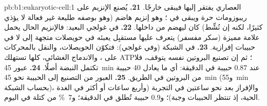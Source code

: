 \begin{solution}{pb:b1:eukaryotic-cell:1}
العصاري يفتقر إليها فيبقى خارجًا.
\textbf{21.} يُصنع الإنزيم على ريبوزومات حرة ويبقى في ؛ وهو إنزيم هاضم (وهو بوصفه طليعة غير فعالة لا يؤذي كثيرًا،
لكنه إن نُشِّط) كان ليهضم  من داخلها.
\textbf{22.} في غولجي البعيد: فالإنزيم الحال يحمل علامة مميزة (سكر
مفسفر) يتعرف عليها مستقبِل يعبئه في حويصلات متجهة إلى  لا في حبيبات إفرازية.
\textbf{23.} في الشبكة (وفي غولجي): فتكوّن الحويصلات، والنقل
بالمحركات على ، والاندماج الغشائي، كلها تستهلك
ATP؛ ثم إن تصنيع البروتين نفسه يتوقف، فلا تكتمل النبضة أصلًا.
\textbf{24.} عبور \qty{45}{min} عند $0.87$ حبيبة في الدقيقة: أي ما
يعادل \qty{40}{} حبيبة من البروتين في الطريق.
\textbf{25.} العبور من التصنيع إلى الحبيبة نحو \qty{45}{min}
(و\qty{55}{min} بحساب الشبكة)، والإفراز بعد نحو ساعتين في التجربة
(وأربع ساعات أو أكثر في الغدة الحية، إذ تنتظر الحبيبات وجبة)؛
و\qty{0.9}{} حبيبة تُطلق في الدقيقة؛ و\qty{7}{\%} من كتلة  في
اليوم.
\end{solution}
